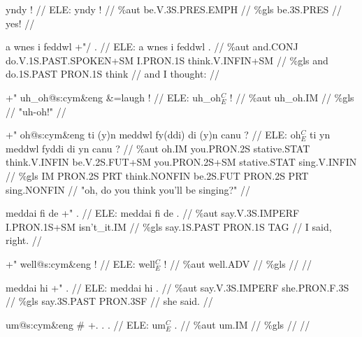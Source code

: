 \documentclass[a4paper,10pt]{article}
\begin{document}
\ex
\begingl[lingstyle=gergl]
\glchat yndy ! //
\glsurface ELE:  yndy !  //
\glauto \%aut  be{\scriptsize .V.3S.PRES.EMPH}   //
\glmanual \%gls  be{\scriptsize .3S.PRES}   //
\gleng yes! //
\endgl
\xe

\ex
\begingl[lingstyle=gergl]
\glchat a wnes i feddwl +"/ . //
\glsurface ELE:  a wnes i feddwl .  //
\glauto \%aut  and{\scriptsize .CONJ} do{\scriptsize .V.1S.PAST.SPOKEN+SM} I{\scriptsize .PRON.1S} think{\scriptsize .V.INFIN+SM}   //
\glmanual \%gls  and do{\scriptsize .1S.PAST} PRON{\scriptsize .1S} think   //
\gleng and I thought: //
\endgl
\xe

\ex
\begingl[lingstyle=gergl]
\glchat +" uh\_oh@s:cym\&eng \&=laugh ! //
\glsurface ELE:  uh\_oh$^{C}_{E}$ !  //
\glauto \%aut  uh\_oh{\scriptsize .IM}   //
\glmanual \%gls     //
\gleng "uh-oh!" //
\endgl
\xe

\ex
\begingl[lingstyle=gergl]
\glchat +" oh@s:cym\&eng ti (y)n meddwl fy(ddi) di (y)n canu ? //
\glsurface ELE:  oh$^{C}_{E}$ ti yn meddwl fyddi di yn canu ?  //
\glauto \%aut  oh{\scriptsize .IM} you{\scriptsize .PRON.2S} stative{\scriptsize .STAT} think{\scriptsize .V.INFIN} be{\scriptsize .V.2S.FUT+SM} you{\scriptsize .PRON.2S+SM} stative{\scriptsize .STAT} sing{\scriptsize .V.INFIN}   //
\glmanual \%gls  IM PRON{\scriptsize .2S} PRT think{\scriptsize .NONFIN} be{\scriptsize .2S.FUT} PRON{\scriptsize .2S} PRT sing{\scriptsize .NONFIN}   //
\gleng "oh, do you think you'll be singing?" //
\endgl
\xe

\ex
\begingl[lingstyle=gergl]
\glchat meddai fi de +" . //
\glsurface ELE:  meddai fi de .  //
\glauto \%aut  say{\scriptsize .V.3S.IMPERF} I{\scriptsize .PRON.1S+SM} isn't\_it{\scriptsize .IM}   //
\glmanual \%gls  say{\scriptsize .1S.PAST} PRON{\scriptsize .1S} TAG   //
\gleng I said, right. //
\endgl
\xe

\ex
\begingl[lingstyle=gergl]
\glchat +" well@s:cym\&eng ! //
\glsurface ELE:  well$^{C}_{E}$ !  //
\glauto \%aut  well{\scriptsize .ADV}   //
\glmanual \%gls     //
\gleng  //
\endgl
\xe

\ex
\begingl[lingstyle=gergl]
\glchat meddai hi +" . //
\glsurface ELE:  meddai hi .  //
\glauto \%aut  say{\scriptsize .V.3S.IMPERF} she{\scriptsize .PRON.F.3S}   //
\glmanual \%gls  say{\scriptsize .3S.PAST} PRON{\scriptsize .3SF}   //
\gleng she said. //
\endgl
\xe

\ex
\begingl[lingstyle=gergl]
\glchat um@s:cym\&eng \# +. . . //
\glsurface ELE:  um$^{C}_{E}$ .  //
\glauto \%aut  um{\scriptsize .IM}   //
\glmanual \%gls     //
\gleng  //
\endgl
\xe
\end{document}
